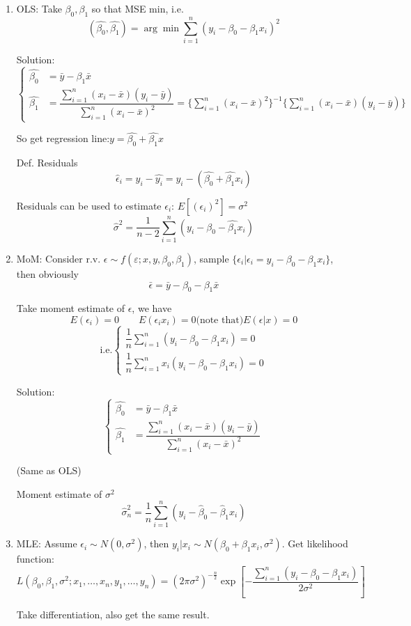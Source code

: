     \begin{enumerate}
        \item OLS: Take $\beta_0,\beta_1$  so that MSE min, i.e.
        \[
            (\hat{\beta_0},\hat{\beta_1})=\arg\min\sum_{i=1}^n(y_i-\beta_0-\beta_1 x_i)^2    
        \]

        Solution:
        \[\begin{cases}
            \hat{\beta_0}&=\bar{y}-\beta_1\bar{x}\\
            \hat{\beta_1}&=\dfrac{\sum_{i=1}^n(x_i-\bar{x})(y_i-\bar{y})}{\sum_{i=1}^n(x_i-\bar{x})^2}=\{\sum_{i=1}^n(x_i-\bar{x})^2\}^{-1}\{\sum_{i=1}^n(x_i-\bar{x})(y_i-\bar{y})\}
        \end{cases}\]

        So get regression line:$y=\hat{\beta_0}+\hat{\beta_1}x$

        Def. Residuals
        \[\hat{\epsilon}_i=y_i-\hat{y_i}=y_i-(\hat{\beta_0}+\hat{\beta_1}x_i)\]


        Residuals can be used to estimate $\epsilon_i$: $E[(\epsilon_i)^2]=\sigma^2$
        \[\hat{\sigma}^2=\frac{1}{n-2}\sum_{i=1}^n(y_i-\hat{\beta_0}-\hat{\beta_1}x_i)\]
        \item MoM: Consider r.v. $\epsilon\sim f(\varepsilon;x,y,\beta_0,\beta_1)$, sample $\{\epsilon_i|\epsilon_i=y_i-\beta_0-\beta_1x_i\}$, then obviously
        \[\bar{\epsilon}=\bar{y}-\beta_0-\beta_1\bar{x}\]

        Take moment estimate of $\epsilon$, we have 
        \[E(\epsilon_i)=0\qquad E(\epsilon_i x_i)=0\text{(note that)}E(\epsilon|x)=0\]
        \[\text{i.e.}\begin{cases}
            
            \dfrac{1}{n}\sum_{i=1}^n(y_i-\beta_0-\beta_1x_i)=0\\
            \dfrac{1}{n}\sum_{i=1}^nx_i(y_i-\beta_0-\beta_1x_i)=0
        \end{cases}\]

        Solution:
        \[\begin{cases}
            \hat{\beta_0}&=\bar{y}-\beta_1\bar{x}\\
            \hat{\beta_1}&=\dfrac{\sum_{i=1}^n(x_i-\bar{x})(y_i-\bar{y})}{\sum_{i=1}^n(x_i-\bar{x})^2}
        \end{cases}\]

        (Same as OLS)

        Moment estimate of $\sigma^2$
        \[\hat{\sigma}^2_n=\frac{1}{n}\sum_{i=1}^n(y_i-\hat{\beta}_0-\hat{\beta}_1x_i)\]

        \item MLE: Assume $\epsilon_i\sim N(0,\sigma^2)$, then $y_i|x_i\sim N(\beta_0+\beta_1x_i,\sigma^2)$. Get likelihood function:
        \[
            L(\beta_0,\beta_1,\sigma^2;x_1,\ldots,x_n,y_1,\ldots,y_n)=(2\pi\sigma^2)^{-\frac{n}{2}}\exp\left[-\frac{\sum_{i=1}^n(y_i-\beta_0-\beta_1x_i)}{2\sigma^2}\right]  
        \]

        Take differentiation, also get the same result.
    \end{enumerate}

